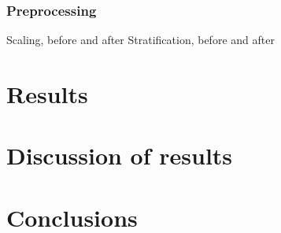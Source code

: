\documentclass[%
oneside,                 %
final,                   %
10pt]{article}
\begin{document}
\subsubsection{Preprocessing}
Scaling, before and after
Stratification, before and after
\section{Results} \label{Section_Results}
\section{Discussion of results} \label{Section_Discussion_of_results}
\section{Conclusions} \label{Section_Conclusions}






\begin{appendices}

\end{appendices}
\end{document}

